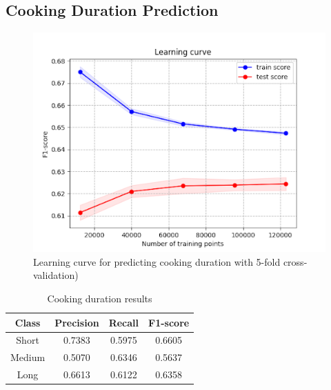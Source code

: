 \documentclass[sigconf]{acmart}
\begin{document}
\subsection{Cooking Duration Prediction}
\begin{figure}[h]
    \centering
    \includegraphics[width=\linewidth]{cooking_duration_learning_curve.png}
    \caption{Learning curve for predicting cooking duration with 5-fold cross-validation)}
    \label{fig:cooking_duration_learning_curve}
\end{figure}
\begin{table}[h]
\begin{tabular}{|c c c c|}
    \hline Class & Precision & Recall & F1-score\\
    \hline\hline Short & 0.7383 & 0.5975 & 0.6605 \\
    \hline Medium & 0.5070 & 0.6346 & 0.5637 \\
    \hline Long & 0.6613 & 0.6122 & 0.6358 \\
    \hline
\end{tabular}
\caption{Cooking duration results}
\label{tab:cooking_duration_results}
\end{table}
\end{document}
